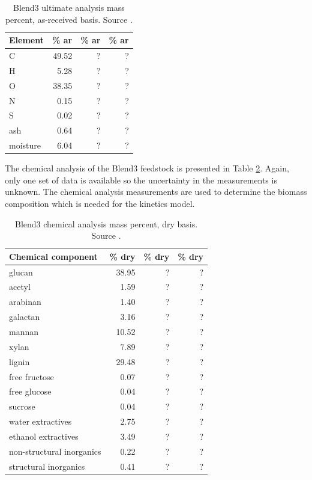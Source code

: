 \begin{table}[H]
    \centering
    \caption{Blend3 ultimate analysis mass percent, as-received basis. Source \cite{Choratch-2017}.}
    \label{tab:blend3-ult}
    \begin{tabular}{lrrr}
        \toprule
        Element & \% ar & \% ar & \% ar \\
        \midrule
        C        & 49.52   & ? & ? \\
        H        & 5.28    & ? & ? \\
        O        & 38.35   & ? & ? \\
        N        & 0.15    & ? & ? \\
        S        & 0.02    & ? & ? \\
        ash      & 0.64    & ? & ? \\
        moisture & 6.04    & ? & ? \\
        \bottomrule
    \end{tabular}
\end{table}

The chemical analysis of the Blend3 feedstock is presented in Table \ref{tab:chem-analysis}. Again, only one set of data is available so the uncertainty in the measurements is unknown. The chemical analysis measurements are used to determine the biomass composition which is needed for the kinetics model.

\begin{table}[H]
    \centering
    \caption{Blend3 chemical analysis mass percent, dry basis. Source \cite{Starace-2020}.}
    \label{tab:chem-analysis}
    \begin{tabular}{lrrr}
        \toprule
        Chemical component & \% dry & \% dry & \% dry \\
        \midrule
        glucan                    & 38.95 & ? & ? \\
        acetyl                    & 1.59  & ? & ? \\
        arabinan                  & 1.40  & ? & ? \\
        galactan                  & 3.16  & ? & ? \\
        mannan                    & 10.52 & ? & ? \\
        xylan                     & 7.89  & ? & ? \\
        lignin                    & 29.48 & ? & ? \\
        free fructose             & 0.07  & ? & ? \\
        free glucose              & 0.04  & ? & ? \\
        sucrose                   & 0.04  & ? & ? \\
        water extractives         & 2.75  & ? & ? \\
        ethanol extractives       & 3.49  & ? & ? \\
        non-structural inorganics & 0.22  & ? & ? \\
        structural inorganics     & 0.41  & ? & ? \\
        \bottomrule
    \end{tabular}
\end{table}

